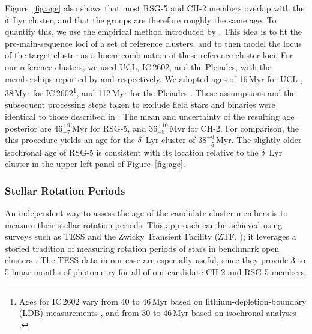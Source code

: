 \documentclass[12pt,twocolumn,linenumbers]{aastex63}
\begin{document}
Figure~\ref{fig:age} also shows that most RSG-5 and
CH-2 members overlap with the $\delta$~Lyr cluster, and that the groups are therefore
roughly the same age.  To quantify this, we use the empirical method
introduced by \citet[][their Section~6.3]{gagne_mutau_2020}.  This
idea is to fit the pre-main-sequence loci of a set of
reference clusters, and to then model the locus of the target cluster
as a linear combination of these reference cluster loci.  For our
reference clusters, we used UCL, IC\,2602, and the Pleiades, with the
memberships reported by \citet{Damiani2019} and
\cite{CantatGaudin2018a} respectively.  We adopted ages of 16\,Myr for
UCL \citep{pecaut_star_2016}, 38\,Myr for IC\,2602\footnote{ Ages for
IC\,2602 vary from 40 to 46\,Myr based on lithium-depletion-boundary
(LDB) measurements \citep{dobbie_ic_2010,randich_gaiaeso_2018}, and
from 30 to 46\,Myr based on isochronal analyses
\citep{stauffer_rotational_1997,david_ages_2015,bossini_age_2019}.},
and 112\,Myr for the Pleiades \citep{dahm_2015}.  These assumptions
and the subsequent processing steps taken to exclude field stars and binaries
were identical to those
described in \citet{bouma_kep1627_2022}.  The mean and 
uncertainty of the resulting age posterior are $46^{+9}_{-7}$\,Myr for
RSG-5, and $36^{+10}_{-8}$\,Myr for CH-2.  For comparison, the this
procedure yields an age for the $\delta$~Lyr cluster of
$38^{+6}_{-5}$\,Myr.  
The slightly older isochronal age of RSG-5 is
consistent with its location
relative to the $\delta$~Lyr cluster in
the upper left panel of Figure~\ref{fig:age}.


\subsubsection{Stellar Rotation Periods}
\label{sec:rotation}

An independent way to assess the age of the candidate cluster members
is to measure their stellar rotation periods.  This approach can be
achieved using surveys such as TESS \citep{ricker_transiting_2015} and
the Zwicky Transient Facility (ZTF, \citealt{bellm_zwicky_2019});
it leverages a storied tradition of measuring rotation periods of stars in
benchmark open clusters \citep[see {\it
e.g.},][]{skumanich_time_1972,curtis_rup147_2020}.  The TESS data in
our case are especially useful, since they provide 3 to 5 lunar months
of photometry for all of our candidate CH-2 and RSG-5 members.
\end{document}
